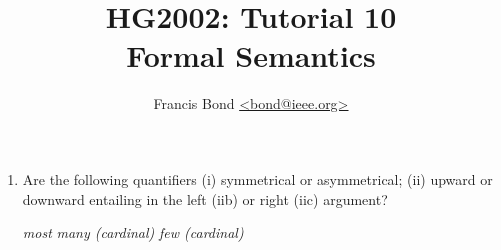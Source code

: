 \documentclass[a4paper]{article}
\title{HG2002: Tutorial 10\\  Formal Semantics}
\author{Francis Bond \url{<bond@ieee.org>}}
\date{}%
\begin{document}
\maketitle

\begin{enumerate}
\item Are the following quantifiers (i) symmetrical or asymmetrical;
  (ii) upward or downward entailing in the left (iib) or right (iic)
  argument?
  \begin{exe}
    \ex \textit{most}
    \ex \textit{many (cardinal)}
    \ex \textit{few (cardinal)}

\end{exe}
\end{enumerate}
\end{document}
